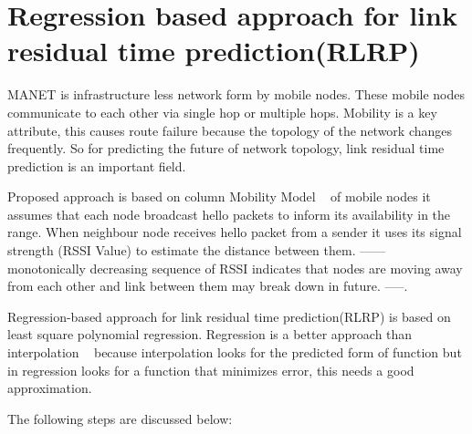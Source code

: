 \documentclass[runningheads]{llncs}
\begin{document}
	\section{Regression based approach for link residual time prediction(RLRP)}
	MANET is infrastructure less network form by mobile nodes. These mobile nodes communicate to each other via single hop or multiple hops. Mobility is a key attribute, this causes route failure because the topology of the network changes frequently. So for predicting the future of network topology, link residual time prediction is an important field.
	\par 
	Proposed approach is based on column Mobility Model ~\cite{r15} of mobile nodes it assumes that each node broadcast hello packets to inform its availability in the range. When neighbour node receives hello packet from a sender it uses its signal strength (RSSI Value) to estimate the distance between them.
	------
	monotonically decreasing sequence of RSSI indicates that nodes are moving away from each other and link between them may break down in future. -----.
	\par
	Regression-based approach for link residual time prediction(RLRP) is based on least square polynomial regression. Regression is a better approach than interpolation ~\cite{r16} because interpolation looks for the predicted form of function but in regression looks for a function that minimizes error, this needs a good approximation. 
	
	The following steps are discussed below: 
	
\end{document}
